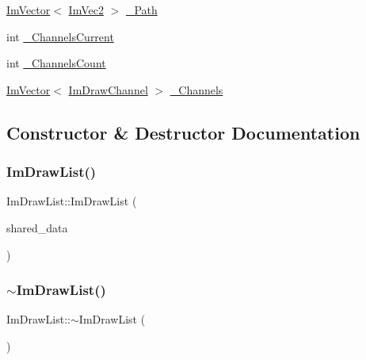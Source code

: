 \begin{DoxyCompactItemize}
\item 
\mbox{\hyperlink{class_im_vector}{Im\+Vector}}$<$ \mbox{\hyperlink{struct_im_vec2}{Im\+Vec2}} $>$ \mbox{\hyperlink{struct_im_draw_list_a5bdc39abf351360500048628b8dc1b07}{\+\_\+\+Path}}
\item 
int \mbox{\hyperlink{struct_im_draw_list_a143ff30108f3dca8c28c7925e23d358b}{\+\_\+\+Channels\+Current}}
\item 
int \mbox{\hyperlink{struct_im_draw_list_ae3854c12dbac41400f4acb65192f5015}{\+\_\+\+Channels\+Count}}
\item 
\mbox{\hyperlink{class_im_vector}{Im\+Vector}}$<$ \mbox{\hyperlink{struct_im_draw_channel}{Im\+Draw\+Channel}} $>$ \mbox{\hyperlink{struct_im_draw_list_ae6be941728e5b2c81a03c78e4aa22629}{\+\_\+\+Channels}}
\end{DoxyCompactItemize}


\subsection{Constructor \& Destructor Documentation}
\mbox{\label{struct_im_draw_list_a7c2af665f2c3e3bb5fc8aa34ef6dac91}} 
\subsubsection{\texorpdfstring{Im\+Draw\+List()}{ImDrawList()}}
{\footnotesize\ttfamily Im\+Draw\+List\+::\+Im\+Draw\+List (\begin{DoxyParamCaption}\item[{const \mbox{\hyperlink{struct_im_draw_list_shared_data}{Im\+Draw\+List\+Shared\+Data}} $\ast$}]{shared\+\_\+data }\end{DoxyParamCaption})\hspace{0.3cm}{\ttfamily [inline]}}

\mbox{\label{struct_im_draw_list_a19fd8d920c202cf8ba5f5c55c43d1d2a}} 
\subsubsection{\texorpdfstring{$\sim$\+Im\+Draw\+List()}{~ImDrawList()}}
{\footnotesize\ttfamily Im\+Draw\+List\+::$\sim$\+Im\+Draw\+List (\begin{DoxyParamCaption}{ }\end{DoxyParamCaption})\hspace{0.3cm}{\ttfamily [inline]}}



